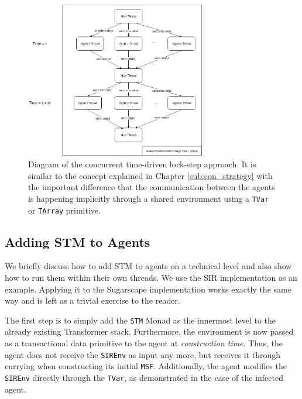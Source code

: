 \begin{figure}
	\centering
	\includegraphics[width=0.7\textwidth, angle=0]{./fig/concurrentabs/stm_abs.png}
	\caption[Diagram of the concurrent time-driven lock-step approach]{Diagram of the concurrent time-driven lock-step approach. It is similar to the concept explained in Chapter \ref{sub:con_strategy} with the important difference that the communication between the agents is happening implicitly through a shared environment using a \texttt{TVar} or \texttt{TArray} primitive.}
	\label{fig:stm_abs_structure}
\end{figure}

\subsection{Adding STM to Agents}
We briefly discuss how to add STM to agents on a technical level and also show how to run them within their own threads. We use the SIR implementation as an example. Applying it to the Sugarscape implementation works exactly the same way and is left as a trivial exercise to the reader.

The first step is to simply add the \texttt{STM} Monad as the innermost level to the already existing Transformer stack. Furthermore, the environment is now passed as a transactional data primitive to the agent at \textit{construction time}. Thus, the agent does not receive the \texttt{SIREnv} as input any more, but receives it through currying when constructing its initial \texttt{MSF}. Additionally, the agent modifies the \texttt{SIREnv} directly through the \texttt{TVar}, as demonstrated in the case of the infected agent.

